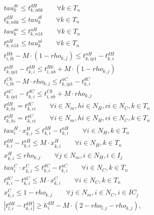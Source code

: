 \begin{align}
  & \mathit{tau}_{k}^{de} \leq t_{k, n0k}^{dH} \qquad \forall k \in T_{n} \tag{eq\_0003\_a} \\
  & t_{k, n0k}^{dH} \leq \mathit{tau}_{k}^{dl} \qquad \forall k \in T_{n} \tag{eq\_0003\_b} \\
  & \mathit{tau}_{k}^{ae} \leq t_{k, n1k}^{aH} \qquad \forall k \in T_{n} \tag{eq\_0004\_a} \\
  & t_{k, n1k}^{aH} \leq \mathit{tau}_{k}^{al} \qquad \forall k \in T_{n} \tag{eq\_0004\_b} \\
  & t_{i,lb}^{Hk} - M \cdot (1 - \mathit{rho}_{k,j}) \leq t_{k,ip1}^{aH} - t_{k,i}^{dH} \tag{eq\_0005\_a} \\
  & t_{k,ip1}^{aH} - t_{k,i}^{dH} \leq t_{i,ub}^{Hk} + M \cdot (1 - \mathit{rho}_{k,j}) \tag{eq\_0005\_b} \\
  & t_{i,lb}^{Ck} - M \cdot \mathit{rho}_{k,j} \leq t_{k,ip1}^{aC} - t_{k,i}^{dC} \tag{eq\_0006\_a} \\
  & t_{k,ip1}^{aC} - t_{k,i}^{dC} \leq t_{i,ub}^{Ck} + M \cdot \mathit{rho}_{k,j} \tag{eq\_0006\_b} \\
  & t_{k,hi}^{dH} = t_{k,ci}^{dC} \qquad \forall i \in N_{m}, hi \in N_{H}, ci \in N_{C}, k \in T_{n} \tag{eq\_0007} \\
  & t_{k,hi}^{aH} = t_{k,ci}^{aC} \qquad \forall i \in N_{m}, hi \in N_{H}, ci \in N_{C}, k \in T_{n} \tag{eq\_0008} \\
  & \mathit{tau}_{i}^{H} \cdot x_{k,i}^{H} \leq t_{k,i}^{dH} - t_{k,i}^{aH} \qquad \forall i \in N_{H}, k \in T_{n} \tag{eq\_0010\_a} \\
  & t_{k,i}^{dH} - t_{k,i}^{aH} \leq M \cdot x_{k,i}^{H} \qquad \forall i \in N_{H}, k \in T_{n} \tag{eq\_0010\_b} \\
  & x_{k,i}^{H} \leq \mathit{rho}_{k,j} \qquad \forall j \in N_{m}, i \in N_{H}, i \in I_{j} \tag{eq\_0011} \\
  & \mathit{tau}_{i}^{C} \cdot x_{k,i}^{C} \leq t_{k,i}^{dC} - t_{k,i}^{aC} \qquad \forall i \in N_{C}, k \in T_{n} \tag{eq\_0012\_a} \\
  & t_{k,i}^{dC} - t_{k,i}^{aC} \leq M \cdot x_{k,i}^{C} \qquad \forall i \in N_{C}, k \in T_{n} \tag{eq\_0012\_b} \\
  & x_{k,i}^{C} \leq 1 - \mathit{rho}_{k,j} \qquad \forall j \in N_{m}, i \in N_{C}, i \in IC_{j} \tag{eq\_0013} \\
  & \left|\right. t_{l , i}^{d H} - t_{k , i}^{d H} \left|\right. \geq h_{i}^{d H} - M \cdot \left(2 - \mathit{rho}_{l , j} - \mathit{rho}_{k , j}\right) , \tag{eq\_0014} \\

\end{align}

